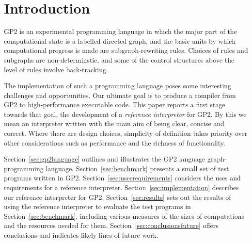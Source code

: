 \section{Introduction}

GP2 is an experimental programming language in which the major part of
the computational state is a labelled directed graph, and the basic
units by which computational progress is made are subgraph-rewriting
rules.
Choices of rules and subgraphs are non-determinstic, and some of
the control structures above the level of rules involve back-tracking.

The implementation of such a programming language poses some
interesting challenges and opportunities.
Our ultimate goal is to produce a compiler from GP2 to
high-performance executable code.
This paper reports a first stage towards that goal, the development
of a \emph{reference interpreter} for GP2.
By this we mean an interpreter written with the main aim of
being clear, concise and correct.
Where there are design choices, simplicity of
definition takes priority over other considerations
such as performance and the richness of functionality.

Section~\ref{sec:gp2language} outlines and illustrates the GP2 language
graph-programming language.
Section~\ref{sec:benchmark} presents a small set of test programs
written in GP2.
Section~\ref{sec:usesrequirements} considers the uses and requirements
for a reference interpreter.
Section~\ref{sec:implementation} describes our reference interpreter for
GP2.
Section~\ref{sec:results} sets out the results of using the reference
interpreter to evaluate the test programs in Section~\ref{sec:benchmark},
including various measures of the sizes of computations and the
resources needed for them.
Section~\ref{sec:conclusionsfuture} offers conclusions and indicates
likely lines of future work.

